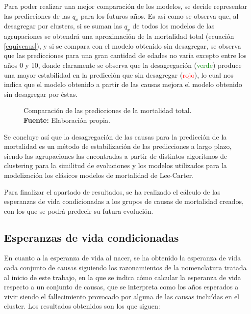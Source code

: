 \documentclass{article}
\begin{document}
Para poder realizar una mejor comparación de los modelos, se decide representar las predicciones de las $q_{x}$ para los futuros años. Es así como se observa que, al desagregar por clusters, si se suman las $q_{x}$ de todos los modelos de las agrupaciones se obtendrá una aproximación de la mortalidad total (ecuación \ref{equivcaus}), y si se compara con el modelo obtenido sin desagregar, se observa que las predicciones para una gran cantidad de edades no varía excepto entre los años 0 y 10, donde claramente se observa que la desagregación (\textcolor{green}{verde}) produce una mayor estabilidad en la predicción que sin desagregar (\textcolor{red}{rojo}), lo cual nos indica que el modelo obtenido a partir de las causas mejora el modelo obtenido sin desagregar por éstas.


\begin{figure}[H]
 \centering
\end{figure}

\begin{figure}[H]
 \centering
\caption{\centering Comparación de las predicciones de la mortalidad total. \\ \textbf{Fuente:} Elaboración propia.}
\label{comparaciontotal}
\end{figure}



Se concluye así que la desagregación de las causas para la predicción de la mortalidad es un método de estabilización de las predicciones a largo plazo, siendo las agrupaciones las encontradas a partir de distintos algoritmos de clustering para la similitud de evoluciones y los modelos utilizados para la modelización los clásicos modelos de mortalidad de Lee-Carter.

Para finalizar el apartado de resultados, se ha realizado el cálculo de las esperanzas de vida condicionadas a los grupos de causas de mortalidad creados, con los que se podrá predecir su futura evolución.

\subsection{Esperanzas de vida condicionadas}

En cuanto a la esperanza de vida al nacer, se ha obtenido la esperanza de vida cada conjunto de causas siguiendo los razonamientos de la nomenclatura tratada al inicio de este trabajo, en la que se indica cómo calcular la esperanza de vida respecto a un conjunto de causas, que se interpreta como los años esperados a vivir siendo el fallecimiento provocado por alguna de las causas incluídas en el cluster. Los resultados obtenidos son los que siguen:
\end{document}
